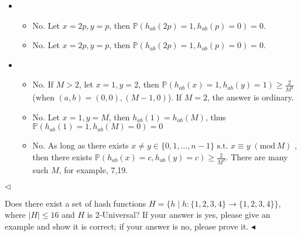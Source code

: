 \documentclass[11pt]{article}
\newenvironment{problem}[2][Problem]{\begin{trivlist}
\item[\hskip \labelsep {\bfseries #1}\hskip \labelsep {\bfseries #2.}]}{\hfill$\blacktriangleleft$\end{trivlist}}
\newenvironment{answer}[1][Answer]{\begin{trivlist}
\item[\hskip \labelsep {\bfseries #1.}\hskip \labelsep]}{\hfill$\lhd$\end{trivlist}}
\begin{document}
\begin{answer}
\begin{itemize}
    \item [(1)] 
    \begin{itemize}
        \item [(a)] No. Let $x= 2p,y=p$, then $\mathbb P(h_{ab}(2p) = 1,h_{ab}(p) = 0) = 0$.
        \item [(b)] No. Let $x= 2p,y=p$, then $\mathbb P(h_{ab}(2p) = 1,h_{ab}(p) = 0) = 0$.
    \end{itemize}
    \item [(2)] 
    \begin{itemize}
        \item [(a)] No. If $M>2$, let $x= 1,y=2$, then $\mathbb P(h_{ab}(x) = 1,h_{ab}(y) = 1) \ge \frac{2}{M^2}$ (when $(a,b) = (0,0), (M-1,0)$). If $M = 2$, the answer is ordinary.
        \item [(b)] No. Let $x = 1, y = M$,  then $h_{ab}(1) = h_{ab}(M)$, thus $\mathbb P(h_{ab}(1) = 1,h_{ab}(M) = 0) = 0$
        \item [(c)] No. As long as there exists $x\neq y\in \{0,1,\dots,n-1\}\text{ s.t. } x\equiv y\;(\mathrm{mod}\,M)$ , then there exists $\mathbb P(h_{ab}(x) =c, h_{ab}(y)=c ) \ge \frac{2}{M^2}$. There are many such $M$, for example, 7,19.
    \end{itemize}
\end{itemize}
\end{answer}


\begin{problem}{6 (12')}
Does there exist a set of hash functions $H=\{h\mid h:\{1,2,3,4\}\rightarrow\{1,2,3,4\}\}$, where $|H| \leq 16$ and $H$ is 2-Universal? If your answer is yes, please give an example and show it is correct; if your answer is no, please prove it.
\end{problem}
\end{document}
